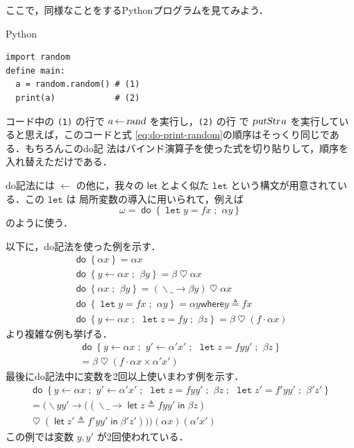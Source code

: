 \documentclass[a5paper,twoside,fleqn,draft]{jsbook}
\newcommand{\programminglanguage}[1]{\textsf{#1}}
\newcommand{\python}{\programminglanguage{Python}}
\newcommand{\code}[1]{\texttt{#1}}
\newenvironment{pythoncode}{\begin{itembox}[r]{\python}}{\end{itembox}}
\newcommand{\mKeyword}[1]{\mathsf{#1}}
\newcommand{\mVarKeyword}[1]{\texttt{#1}}
\newcommand{\mDoKeyword}{\mKeyword{do}}
\newcommand{\mDoLetKeyword}{\mVarKeyword{let}}
\newcommand{\mInKeyword}{\mKeyword{in}}
\newcommand{\mLetKeyword}{\mKeyword{let}}
\newcommand{\mWhereKeyword}{\mKeyword{where}}
\DeclareMathOperator{\mDoKW}{\mDoKeyword}
\DeclareMathOperator{\mLet}{\mLetKeyword}
\DeclareMathOperator{\mLetIn}{\mInKeyword}
\newcommand{\mAction}[1]{\textsl{#1}}
\DeclareMathOperator{\mPutStr}{\mAction{putStr}}
\DeclareMathOperator{\mRand}{\mAction{rand}}
\DeclareMathOperator{\mAppMap}{\times}
\DeclareMathOperator{\mBind}{\heartsuit}
\DeclareMathOperator{\mDoEq}{\leftarrow}
\DeclareMathOperator{\mDoLetEq}{\mVarKeyword{=}}
\DeclareMathOperator{\mDoNext}{;\;}
\DeclareMathOperator{\mLambda}{\backslash}
\DeclareMathOperator{\mLambdaArrow}{\rightarrow}
\DeclareMathOperator{\mLetEq}{\triangleq}
\DeclareMathOperator{\mMap}{\cdot}
\newcommand{\mDo}[1]{\mDoKW\left\{#1\right\}}
\newcommand{\mDoLet}[2]{\mathop{\mDoLetKeyword}#1\mDoLetEq#2}
\newcommand{\mLambdaEXP}[2]{\mLambda{#1}\mLambdaArrow{#2}} %
\newcommand{\mLetInEXP}[3]{\mLet#1\mLetEq#2\mLetIn{#3}} %
\newcommand{\mWhereIsEXP}[2]{\mathbin{\mWhereKeyword}#1\mLetEq#2} %
\begin{document}
ここで，同様なことをする\python プログラムを見てみよう．
\begin{pythoncode}
\begin{verbatim}
import random
define main:
  a = random.random() # (1)
  print(a)            # (2)
\end{verbatim}
\end{pythoncode}
コード中の \code{(1)} の行で $a\mDoEq\mRand$ を実行し，\code{(2)} の行
で $\mPutStr a$ を実行していると思えば，このコードと式
\eqref{eq:do-print-random}の順序はそっくり同じである．もちろんこのdo記
法はバインド演算子を使った式を切り貼りして，順序を入れ替えただけである．

do記法には $\mDoEq$ の他に，我々の $\mLetKeyword$ とよく似た
$\mDoLetKeyword$ という構文が用意されている．この $\mDoLetKeyword$ は
局所変数の導入に用いられて，例えば
\begin{equation}
\omega=\mDo{\mDoLet{y}{fx}\mDoNext\alpha y}
\end{equation}
のように使う．

以下に，do記法を使った例を示す．
\begin{gather}
\mDo{\alpha x}=\alpha x\\
\mDo{y\mDoEq\alpha x\mDoNext\beta y}=\beta\mBind\alpha x\\
\mDo{\alpha x\mDoNext\beta y}=(\mLambdaEXP{\_}{\beta y})\mBind \alpha x\label{eq:do-alpha-beta}\\
\mDo{\mDoLet{y}{fx}\mDoNext\alpha y}=\alpha y\mWhereIsEXP{y}{fx}\\
\mDo{y\mDoEq\alpha x\mDoNext\mDoLet{z}{fy}\mDoNext\beta z}
=\beta\mBind{}(f\mMap\alpha x)
\end{gather}
より複雑な例も挙げる．
\begin{multline}
\mDo{y\mDoEq\alpha x\mDoNext y'\mDoEq\alpha'x'\mDoNext\mDoLet{z}{fyy'}
\mDoNext\beta z}\\
=\beta\mBind{}(f\mMap\alpha x\mAppMap\alpha'x')
\end{multline}
最後にdo記法中に変数を2回以上使いまわす例を示す．
\begin{multline}
\mDo{y\mDoEq\alpha x\mDoNext y'\mDoEq\alpha'x'\mDoNext\mDoLet{z}{fyy'}\mDoNext\beta z\mDoNext\mDoLet{z'}{f'yy'}\mDoNext\beta'z'}\\
=(\mLambda yy'\mLambdaArrow{}((\mLambdaEXP{\_}{\mLetInEXP{z}{fyy'}{\beta z}})\\
\mBind{}(\mLetInEXP{z'}{f'yy'}{\beta'z'}))) (\alpha x)(\alpha'x')
\end{multline}
この例では変数 $y,y'$ が2回使われている．
\end{document}
